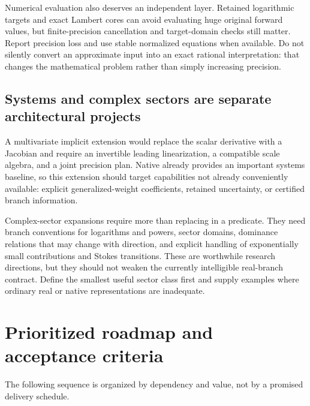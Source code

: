 \documentclass[11pt,a4paper]{article}
\newcommand{\code}[1]{\texttt{\detokenize{#1}}}
\begin{document}
Numerical evaluation also deserves an independent layer. Retained logarithmic targets and exact Lambert cores can avoid evaluating huge original forward values, but finite-precision cancellation and target-domain checks still matter. Report precision loss and use stable normalized equations when available. Do not silently convert an approximate input into an exact rational interpretation: that changes the mathematical problem rather than simply increasing precision.

\subsection{Systems and complex sectors are separate architectural projects}

A multivariate implicit extension would replace the scalar derivative with a Jacobian and require an invertible leading linearization, a compatible scale algebra, and a joint precision plan. Native \code{AsymptoticSolve} already provides an important systems baseline, so this extension should target capabilities not already conveniently available: explicit generalized-weight coefficients, retained uncertainty, or certified branch information.\cite{wl-solve}

Complex-sector expansions require more than replacing \code{Reals} in a predicate. They need branch conventions for logarithms and powers, sector domains, dominance relations that may change with direction, and explicit handling of exponentially small contributions and Stokes transitions. These are worthwhile research directions, but they should not weaken the currently intelligible real-branch contract. Define the smallest useful sector class first and supply examples where ordinary real or native representations are inadequate.\cite{wl-asymptotic,dlmf-asymptotics}

\section{Prioritized roadmap and acceptance criteria}

The following sequence is organized by dependency and value, not by a promised delivery schedule.
\end{document}
